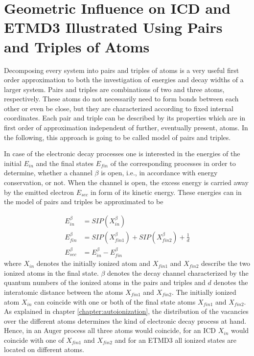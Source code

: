 \chapter{Geometric Influence on ICD and ETMD3  Illustrated Using Pairs and Triples of Atoms}
\label{chapter:geom}
Decomposing every system into pairs and triples of atoms is a very useful
first order approximation to both the investigation of energies and
decay widths of a larger system. Pairs and triples are combinations of
two and three atoms, respectively.
These atoms do not necessarily need to form bonds between each other or
even be close, but they are characterized according to fixed internal
coordinates. Each pair and triple can be described by its properties
which are in first order of approximation independent of further, eventually
present, atoms. In the following, this approach is going to be called
model of pairs and triples.

In case of the electronic decay processes one is interested in the
energies of the initial $E_{in}$ and the final states $E_{fin}$ of
the corresponding processes in order to determine, whether a channel $\beta$
is open, i.e., in accordance with energy conservation, or not. When the channel
is open, the excess energy is carried away by the emitted electron $E_{sec}$
in form of its kinetic energy. These energies can in the model
of pairs and triples be approximated to be

\begin{align}
 E_{in}^\beta  &= SIP(X_{in}^\beta) \label{equation:E_in}\\
 E_{fin}^\beta &= SIP(X_{fin1}^\beta) + SIP(X_{fin2}^\beta) + \frac 1d
           \label{equation:E_fin}\\
 E_{sec}^\beta &= E_{in}^\beta - E_{fin}^\beta \label{equation:E_sec}
\end{align}
where $X_{in}$ denotes the initially ionized atom and
$X_{fin1}$ and $X_{fin2}$ describe the two ionized
atoms in the final state. $\beta$ denotes the decay channel characterized
by the quantum numbers of the ionized atoms in the pairs
and triples and $d$ denotes the interatomic distance between the atoms
$X_{fin1}$ and $X_{fin2}$. The initially ionized atom $X_{in}$ can
coincide with one or both of
the final state atoms
$X_{fin1}$ and $X_{fin2}$. As explained in
chapter \ref{chapter:autoionization}, the distribution
of the vacancies over the different
atoms determines the kind of electronic decay process at hand. Hence, in an
Auger process all three atoms would coincide, for an ICD $X_{in}$
would coincide with one of $X_{fin1}$ and $X_{fin2}$ and for an \ac{ETMD}3
all ionized states are located on different atoms.

